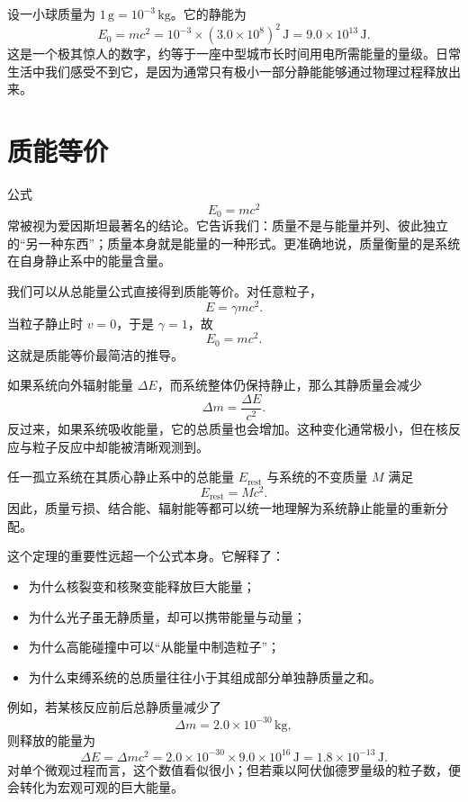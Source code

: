 \begin{example}[静能的数量级]
设一小球质量为 $1\,\mathrm{g}=10^{-3}\,\mathrm{kg}$。它的静能为
\[
E_0 = mc^2 = 10^{-3}\times (3.0\times 10^8)^2\,\mathrm{J}
=9.0\times 10^{13}\,\mathrm{J}.
\]
这是一个极其惊人的数字，约等于一座中型城市长时间用电所需能量的量级。日常生活中我们感受不到它，是因为通常只有极小一部分静能能够通过物理过程释放出来。
\end{example}

\section{质能等价}

公式
\[
E_0=mc^2
\]
常被视为爱因斯坦最著名的结论。它告诉我们：质量不是与能量并列、彼此独立的“另一种东西”；质量本身就是能量的一种形式。更准确地说，质量衡量的是系统在自身静止系中的能量含量。

我们可以从总能量公式直接得到质能等价。对任意粒子，
\[
E=\gamma mc^2.
\]
当粒子静止时 $v=0$，于是 $\gamma=1$，故
\[
E_0=mc^2.
\]
这就是质能等价最简洁的推导。

如果系统向外辐射能量 $\Delta E$，而系统整体仍保持静止，那么其静质量会减少
\[
\Delta m = \frac{\Delta E}{c^2}.
\]
反过来，如果系统吸收能量，它的总质量也会增加。这种变化通常极小，但在核反应与粒子反应中却能被清晰观测到。

\begin{theorem}[质能等价的系统表述]
任一孤立系统在其质心静止系中的总能量 $E_{\mathrm{rest}}$ 与系统的不变质量 $M$ 满足
\[
E_{\mathrm{rest}} = Mc^2.
\]
因此，质量亏损、结合能、辐射能等都可以统一地理解为系统静止能量的重新分配。
\end{theorem}

这个定理的重要性远超一个公式本身。它解释了：
\begin{itemize}
  \item 为什么核裂变和核聚变能释放巨大能量；
  \item 为什么光子虽无静质量，却可以携带能量与动量；
  \item 为什么高能碰撞中可以“从能量中制造粒子”；
  \item 为什么束缚系统的总质量往往小于其组成部分单独静质量之和。
\end{itemize}

例如，若某核反应前后总静质量减少了
\[
\Delta m = 2.0\times 10^{-30}\,\mathrm{kg},
\]
则释放的能量为
\[
\Delta E = \Delta m c^2 = 2.0\times 10^{-30}\times 9.0\times 10^{16}\,\mathrm{J}
=1.8\times 10^{-13}\,\mathrm{J}.
\]
对单个微观过程而言，这个数值看似很小；但若乘以阿伏伽德罗量级的粒子数，便会转化为宏观可观的巨大能量。

